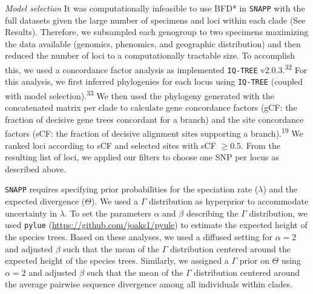 \documentclass[
  11pt,
]{article}
\begin{document}
\emph{Model selection} It was computationally infeasible to use BFD* in \texttt{SNAPP} with the full datasets given the large number of specimens and loci within each clade (See Results). Therefore, we subsampled each genogroup to two specimens maximizing the data available (genomics, phenomics, and geographic distribution) and then reduced the number of loci to a computationally tractable size. To accomplish this, we used a concordance factor analysis as implemented \texttt{IQ-TREE} v2.0.3.\textsuperscript{32} For this analysis, we first inferred phylogenies for each locus using \texttt{IQ-TREE} (coupled with model selection).\textsuperscript{33} We then used the phylogeny generated with the concatenated matrix per clade to calculate gene concordance factors (gCF: the fraction of decisive gene trees concordant for a branch) and the site concordance factors (sCF: the fraction of decisive alignment sites supporting a branch).\textsuperscript{19} We ranked loci according to sCF and selected sites with sCF \(\geqslant 0.5\). From the resulting list of loci, we applied our filters to choose one SNP per locus as described above.

\texttt{SNAPP} requires specifying prior probabilities for the speciation rate (\(\lambda\)) and the expected divergence (\(\Theta\)). We used a \(\Gamma\) distribution as hyperprior to accommodate uncertainty in \(\lambda\). To set the parameters \(\alpha\) and \(\beta\) describing the \(\Gamma\) distribution, we used \texttt{pylue} (\url{https://github.com/joaks1/pyule}) to estimate the expected height of the species trees. Based on these analyses, we used a diffused setting for \(\alpha=2\) and adjusted \(\beta\) such that the mean of the \(\Gamma\) distribution centered around the expected height of the species trees. Similarly, we assigned a \(\Gamma\) prior on \(\Theta\) using \(\alpha=2\) and adjusted \(\beta\) such that the mean of the \(\Gamma\) distribution centered around the average pairwise sequence divergence among all individuals within clades.
\end{document}

